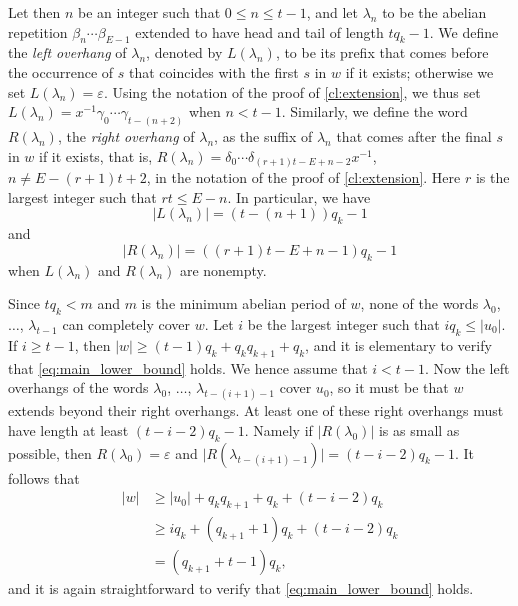 \documentclass[a4paper,fleqn]{article}
\providecommand{\abs}[1]{\lvert#1\rvert}
\begin{document}
  Let then $n$ be an integer such that $0 \leq n \leq t - 1$, and let $\lambda_n$ to be the abelian repetition
  $\beta_n \cdots \beta_{E-1}$ extended to have head and tail of length $tq_k - 1$. We define the \emph{left overhang}
  of $\lambda_n$, denoted by $L(\lambda_n)$, to be its prefix that comes before the occurrence of $s$ that coincides
  with the first $s$ in $w$ if it exists; otherwise we set $L(\lambda_n) = \varepsilon$. Using the notation of the
  proof of \autoref{cl:extension}, we thus set $L(\lambda_n) = x^{-1} \gamma_0 \cdots \gamma_{t - (n + 2)}$ when
  $n < t - 1$. Similarly, we define the word $R(\lambda_n)$, the \emph{right overhang} of $\lambda_n$, as the suffix of
  $\lambda_n$ that comes after the final $s$ in $w$ if it exists, that is, $R(\lambda_n) = \delta_0 \cdots
  \delta_{(r+1)t - E + n - 2}x^{-1}$, $n \neq E - (r + 1)t + 2$, in the notation of the proof of
  \autoref{cl:extension}. Here $r$ is the largest integer such that $rt \leq E - n$. In particular, we have
  \begin{equation*}
    \abs{L(\lambda_n)} = (t - (n + 1))q_k - 1
  \end{equation*}
  and
  \begin{equation*}
    \abs{R(\lambda_n)} = ((r + 1)t - E + n - 1)q_k - 1
  \end{equation*}
  when $L(\lambda_n)$ and $R(\lambda_n)$ are nonempty.

  Since $tq_k < m$ and $m$ is the minimum abelian period of $w$, none of the words $\lambda_0$, $\ldots$,
  $\lambda_{t-1}$ can completely cover $w$. Let $i$ be the largest integer such that $iq_k \leq \abs{u_0}$. If
  $i \geq t - 1$, then $\abs{w} \geq (t - 1)q_k + q_k q_{k+1} + q_k$, and it is elementary to verify that
  \eqref{eq:main_lower_bound} holds. We hence assume that $i < t - 1$. Now the left overhangs of the words $\lambda_0$,
  $\ldots$, $\lambda_{t - (i + 1) - 1}$ cover $u_0$, so it must be that $w$ extends beyond their right overhangs. At
  least one of these right overhangs must have length at least $(t - i - 2)q_k - 1$. Namely if $\abs{R(\lambda_0)}$ is
  as small as possible, then $R(\lambda_0) = \varepsilon$ and
  $\abs{R(\lambda_{t - (i + 1) - 1})} = (t - i - 2)q_k - 1$. It follows that
  \begin{align*}
    \abs{w} &\geq \abs{u_0} + q_k q_{k+1} + q_k + (t - i - 2)q_k \\
            &\geq iq_k + (q_{k+1} + 1)q_k + (t - i - 2)q_k \\
            &= (q_{k+1} + t - 1)q_k,
  \end{align*}
  and it is again straightforward to verify that \eqref{eq:main_lower_bound} holds.
\end{document}

